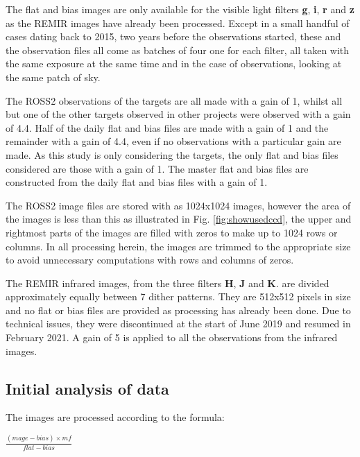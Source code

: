 The flat and bias images are only available for the visible light filters \textbf{g},
\textbf{i}, \textbf{r} and \textbf{z} as the REMIR images have already been
processed. Except in a small handful of cases dating back to 2015, two years
before the {\rdwarf} observations started, these and the observation files all come as batches of four one for each filter, all
taken with the same exposure at the same time and in the case of observations,
looking at the same patch of sky.

The ROSS2 observations of the {\rdwarf} targets are all made with a gain of 1,
whilst all but one of the other targets observed in other projects were observed
with a gain of 4.4. Half of the daily flat and bias files are made with a gain
of 1 and the remainder with a gain of 4.4, even if no observations with a
particular gain are made. As this study is only considering the {\rdwarf}
targets, the only flat and bias files considered are those with a gain of 1.
The master flat and bias files are constructed from the daily flat and bias
files with a gain of 1.

The ROSS2 image files are stored with as 1024x1024 images, however the area of
the images is less than this as illustrated in Fig. \ref{fig:showusedccd}, the
upper and rightmost parts of the images are filled with zeros to make up to 1024
rows or columns. In all processing herein, the images are trimmed to the
appropriate size to avoid unnecessary computations with rows and columns of
zeros.

The REMIR infrared images, from the three filters \textbf{H}, \textbf{J} and
\textbf{K}. are divided approximately equally between 7 dither patterns. They
are 512x512 pixels in size and no flat or bias files are provided as
processing has already been done. Due to technical issues, they were
discontinued at the start of June 2019 and resumed in February 2021. A gain of 5
is applied to all the observations from the infrared images.

\subsection{Initial analysis of data}
\protect\label{section:initialanalysis}

The images are processed according to the formula:

\begin{center}
$ \frac{(mage - bias) \times mf}{flat - bias}$
\end{center}

